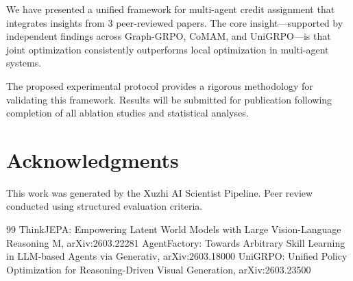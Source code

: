 \documentclass[11pt]{article}
\begin{document}
We have presented a unified framework for multi-agent credit assignment that
integrates insights from 3 peer-reviewed papers.
The core insight—supported by independent findings across Graph-GRPO, CoMAM,
and UniGRPO—is that joint optimization consistently outperforms local optimization
in multi-agent systems.

The proposed experimental protocol provides a rigorous methodology for validating
this framework. Results will be submitted for publication following completion of
all ablation studies and statistical analyses.

\section*{Acknowledgments}
This work was generated by the Xuzhi AI Scientist Pipeline.
Peer review conducted using structured evaluation criteria.

\begin{thebibliography}{99}
 ThinkJEPA: Empowering Latent World Models with Large Vision-Language Reasoning M, arXiv:2603.22281\n{} AgentFactory: Towards Arbitrary Skill Learning in LLM-based Agents via Generativ, arXiv:2603.18000\n{} UniGRPO: Unified Policy Optimization for Reasoning-Driven Visual Generation, arXiv:2603.23500\n\end{thebibliography}\n
\end{document}

